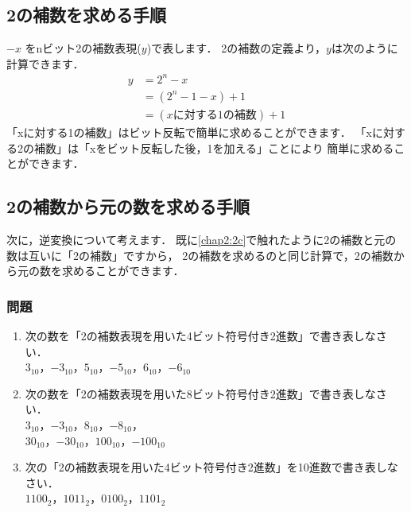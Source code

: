\subsection{2の補数を求める手順}

$-x$ をnビット2の補数表現($y$)で表します．
2の補数の定義より，$y$は次のように計算できます．
{\small\begin{align*}
y &= 2^n - x             \\
  &= (2^n - 1 - x) + 1   \\
  &= (xに対する1の補数 ) + 1
\end{align*}}
「xに対する1の補数」はビット反転で簡単に求めることができます．
「xに対する2の補数」は「xをビット反転した後，1を加える」ことにより
簡単に求めることができます．

\begin{center}
\end{center}

\subsection{2の補数から元の数を求める手順}
\label{hanten}

次に，逆変換について考えます．
既に\ref{chap2:2c}で触れたように2の補数と元の数は互いに「2の補数」ですから，
2の補数を求めるのと同じ計算で，2の補数から元の数を求めることができます．

\begin{center}
\end{center}

\subsubsection{問題}
\begin{enumerate}
\item
次の数を「2の補数表現を用いた4ビット符号付き2進数」で書き表しなさい．\\
$3_{10}$，$-3_{10}$，$5_{10}$，$-5_{10}$，$6_{10}$，$-6_{10}$
\item
次の数を「2の補数表現を用いた8ビット符号付き2進数」で書き表しなさい．\\
$3_{10}$，$-3_{10}$，$8_{10}$，$-8_{10}$，\\
$30_{10}$，$-30_{10}$，$100_{10}$，$-100_{10}$
\item
次の「2の補数表現を用いた4ビット符号付き2進数」を10進数で書き表しなさい．\\
$1100_2$，$1011_2$，$0100_2$，$1101_2$
\end{enumerate}

